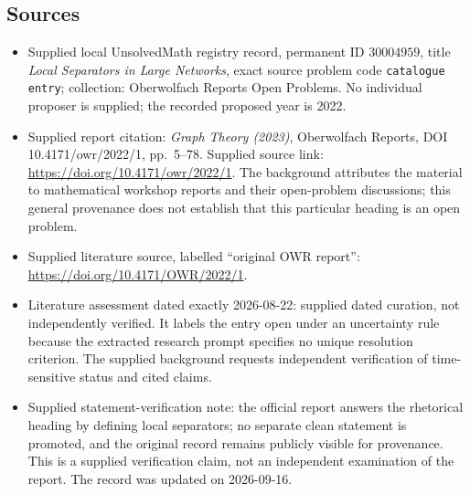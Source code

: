 \documentclass[11pt]{article}
\begin{document}
\subsection{Sources}
\begin{itemize}
\item Supplied local UnsolvedMath registry record, permanent ID \(30004959\), title \emph{Local Separators in Large Networks}, exact source problem code \texttt{catalogue entry}; collection: Oberwolfach Reports Open Problems. No individual proposer is supplied; the recorded proposed year is 2022.
\item Supplied report citation: \emph{Graph Theory (2023)}, Oberwolfach Reports, DOI 10.4171/owr/2022/1, pp.\ 5--78. Supplied source link: \url{https://doi.org/10.4171/owr/2022/1}. The background attributes the material to mathematical workshop reports and their open-problem discussions; this general provenance does not establish that this particular heading is an open problem.
\item Supplied literature source, labelled ``original OWR report'': \url{https://doi.org/10.4171/OWR/2022/1}.
\item Literature assessment dated exactly 2026-08-22: supplied dated curation, not independently verified. It labels the entry open under an uncertainty rule because the extracted research prompt specifies no unique resolution criterion. The supplied background requests independent verification of time-sensitive status and cited claims.
\item Supplied statement-verification note: the official report answers the rhetorical heading by defining local separators; no separate clean statement is promoted, and the original record remains publicly visible for provenance. This is a supplied verification claim, not an independent examination of the report. The record was updated on 2026-09-16.
\end{itemize}
\end{document}
